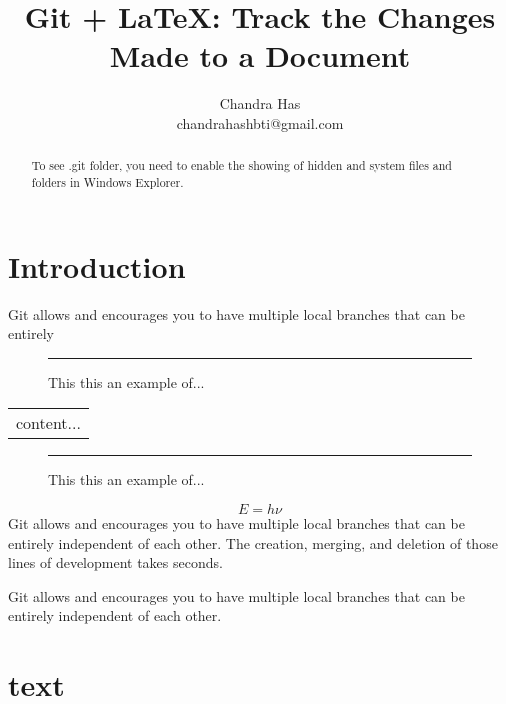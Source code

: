 \documentclass[a4paper,12pt]{article}
\title{Git + \LaTeX: Track the Changes Made to a Document}
\author{Chandra Has\\ \small chandrahashbti@gmail.com}\date{}
\begin{document}
\maketitle	
	


\begin{abstract}
To see .git folder, you need to enable the showing of hidden and system files and folders in Windows Explorer.
\end{abstract}

\section{Introduction}
Git allows and encourages you to have multiple local branches that can be entirely 

\begin{figure}[!h]\centering\rule{3cm}{3cm}
	\caption{This this an example of...}
\end{figure}

\begin{tabular}{c}
	content...
\end{tabular}

\begin{figure}[!h]\centering\rule{4cm}{4cm}
	\caption{This this an example of...}
\end{figure}

\begin{equation}E=h\nu\end{equation}
Git allows and encourages you to have multiple local branches that can be entirely independent of each other. The creation, merging, and deletion of those lines of development takes seconds.

Git allows and encourages you to have multiple local branches that can be entirely independent of each other. 

\section{text}
\end{document}
